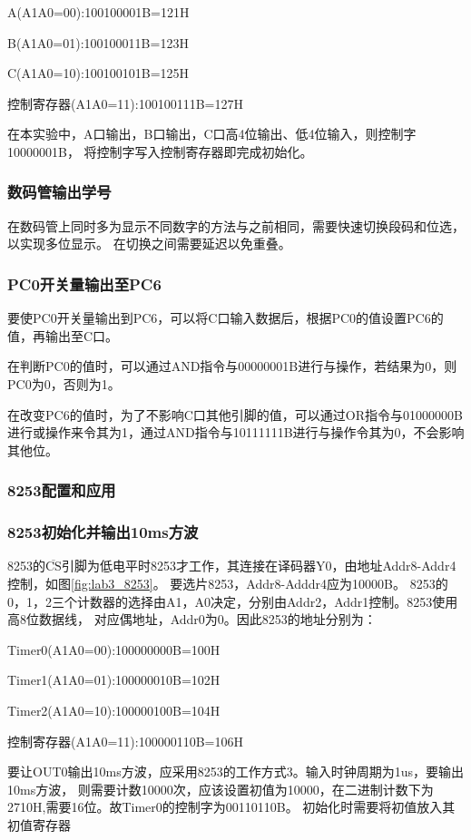 \documentclass[12pt, a4paper, oneside]{ctexart}
\begin{document}
    
    A(A1A0=00):100100001B=121H

    B(A1A0=01):100100011B=123H

    C(A1A0=10):100100101B=125H

    控制寄存器(A1A0=11):100100111B=127H

    在本实验中，A口输出，B口输出，C口高4位输出、低4位输入，则控制字10000001B，
    将控制字写入控制寄存器即完成初始化。

    \subsubsection{数码管输出学号}
    在数码管上同时多为显示不同数字的方法与之前相同，需要快速切换段码和位选，以实现多位显示。
    在切换之间需要延迟以免重叠。

    \subsubsection{PC0开关量输出至PC6}
    要使PC0开关量输出到PC6，可以将C口输入数据后，根据PC0的值设置PC6的值，再输出至C口。
    
    在判断PC0的值时，可以通过AND指令与00000001B进行与操作，若结果为0，则PC0为0，否则为1。

    在改变PC6的值时，为了不影响C口其他引脚的值，可以通过OR指令与01000000B进行或操作来令其为1，通过AND指令与10111111B进行与操作令其为0，不会影响其他位。
    \subsubsection{8253配置和应用}
    \subsubsection{8253初始化并输出10ms方波}
    8253的$\overline{\text{CS}}$引脚为低电平时8253才工作，其连接在译码器Y0，由地址Addr8-Addr4控制，如图\ref{fig:lab3_8253}。
    要选片8253，Addr8-Adddr4应为10000B。
    8253的0，1，2三个计数器的选择由A1，A0决定，分别由Addr2，Addr1控制。8253使用高8位数据线，
    对应偶地址，Addr0为0。因此8253的地址分别为：

    Timer0(A1A0=00):100000000B=100H

    Timer1(A1A0=01):100000010B=102H

    Timer2(A1A0=10):100000100B=104H

    控制寄存器(A1A0=11):100000110B=106H

    要让OUT0输出10ms方波，应采用8253的工作方式3。输入时钟周期为1us，要输出10ms方波，
    则需要计数10000次，应该设置初值为10000，在二进制计数下为2710H,需要16位。故Timer0的控制字为00110110B。
    初始化时需要将初值放入其初值寄存器
\end{document}
